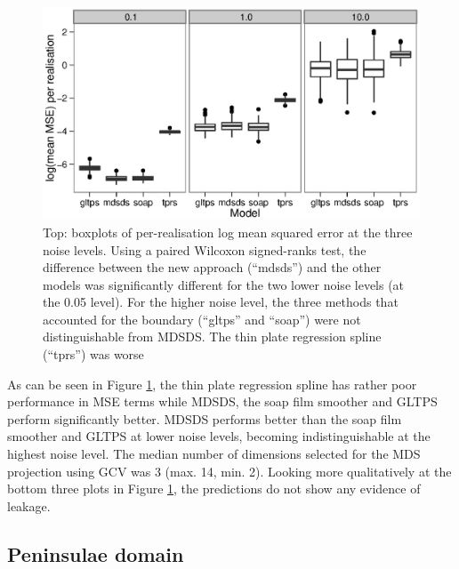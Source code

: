\documentclass[smallextended]{svjour3}       %
\begin{document}
\begin{figure}
\centering
\includegraphics[width=\textwidth]{Fig4.eps}
\caption{Top: boxplots of per-realisation log mean squared error at the three noise levels. Using a paired Wilcoxon signed-ranks test, the difference between the new approach (``mdsds'') and the other models was significantly different for the two lower noise levels (at the 0.05 level). For the higher noise level, the three methods that accounted for the boundary (``gltps'' and ``soap'') were not distinguishable from MDSDS. The thin plate regression spline (``tprs'') was worse
\label{ramsay-results}}
\end{figure}

As can be seen in Figure \ref{ramsay-results}, the thin plate regression spline has rather poor performance in MSE terms while MDSDS, the soap film smoother and GLTPS perform significantly better. MDSDS performs better than the soap film smoother and GLTPS at lower noise levels, becoming indistinguishable at the highest noise level. The median number of dimensions selected for the MDS projection using GCV was 3 (max. 14, min. 2). Looking more qualitatively at the bottom three plots in Figure \ref{ramsay-results}, the predictions do not show any evidence of leakage.


\subsection{Peninsulae domain}
\end{document}
